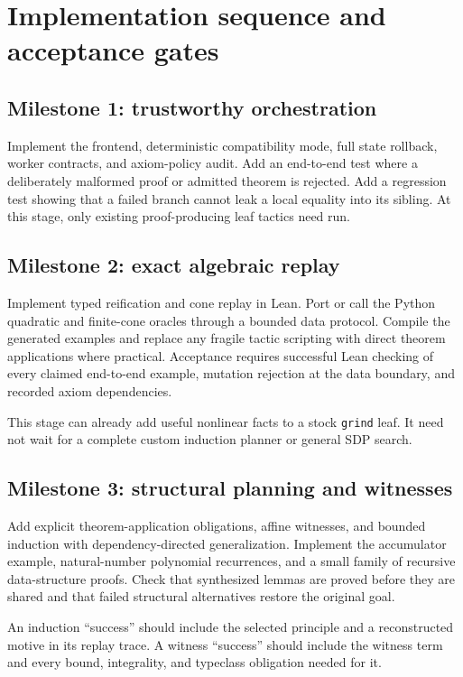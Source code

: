 \documentclass[11pt,a4paper]{article}
\theoremstyle{definition}
\newcommand{\grind}{\texttt{grind}}
\begin{document}
\section{Implementation sequence and acceptance gates}

\subsection{Milestone 1: trustworthy orchestration}

Implement the frontend, deterministic compatibility mode, full state rollback, worker contracts, and axiom-policy audit. Add an end-to-end test where a deliberately malformed proof or admitted theorem is rejected. Add a regression test showing that a failed branch cannot leak a local equality into its sibling. At this stage, only existing proof-producing leaf tactics need run.

\subsection{Milestone 2: exact algebraic replay}

Implement typed reification and cone replay in Lean. Port or call the Python quadratic and finite-cone oracles through a bounded data protocol. Compile the generated examples and replace any fragile tactic scripting with direct theorem applications where practical. Acceptance requires successful Lean checking of every claimed end-to-end example, mutation rejection at the data boundary, and recorded axiom dependencies.

This stage can already add useful nonlinear facts to a stock \grind{} leaf. It need not wait for a complete custom induction planner or general SDP search.

\subsection{Milestone 3: structural planning and witnesses}

Add explicit theorem-application obligations, affine witnesses, and bounded induction with dependency-directed generalization. Implement the accumulator example, natural-number polynomial recurrences, and a small family of recursive data-structure proofs. Check that synthesized lemmas are proved before they are shared and that failed structural alternatives restore the original goal.

An induction ``success'' should include the selected principle and a reconstructed motive in its replay trace. A witness ``success'' should include the witness term and every bound, integrality, and typeclass obligation needed for it.
\end{document}
